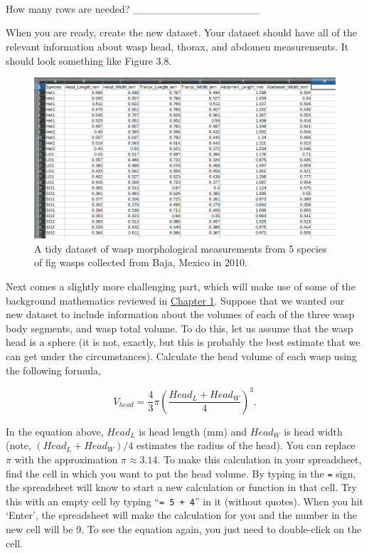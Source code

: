 \documentclass[
]{scrbook}
\begin{document}
\begin{verbatim}




\end{verbatim}

How many rows are needed? \_\_\_\_\_\_\_\_\_\_\_\_\_\_\_\_\_

When you are ready, create the new dataset.
Your dataset should have all of the relevant information about wasp head, thorax, and abdomen measurements.
It should look something like Figure 3.8.

\begin{figure}
\includegraphics[width=1\linewidth]{img/Ch1_Ex3_tidy} \caption{A tidy dataset of wasp morphological measurements from 5 species of fig wasps collected from Baja, Mexico in 2010.}\label{fig:unnamed-chunk-16}
\end{figure}

Next comes a slightly more challenging part, which will make use of some of the background mathematics reviewed in \protect\hyperlink{Chapter_1}{Chapter 1}.
Suppose that we wanted our new dataset to include information about the volumes of each of the three wasp body segments, and wasp total volume.
To do this, let us assume that the wasp head is a sphere (it is not, exactly, but this is probably the best estimate that we can get under the circumstances).
Calculate the head volume of each wasp using the following formula,

\[V_{head} = \frac{4}{3}\pi \left(\frac{Head_L + Head_W}{4}\right)^{3}.\]

In the equation above, \(Head_{L}\) is head length (mm) and \(Head_{W}\) is head width (note, \((Head_L + Head_W)/4\) estimates the radius of the head).
You can replace \(\pi\) with the approximation \(\pi \approx 3.14\).
To make this calculation in your spreadsheet, find the cell in which you want to put the head volume.
By typing in the \texttt{=} sign, the spreadsheet will know to start a new calculation or function in that cell.
Try this with an empty cell by typing ``\texttt{=\ 5\ +\ 4}'' in it (without quotes).
When you hit `Enter', the spreadsheet will make the calculation for you and the number in the new cell will be 9.
To see the equation again, you just need to double-click on the cell.
\end{document}
